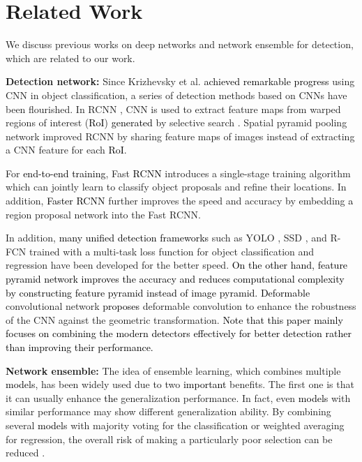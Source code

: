\documentclass[10pt,twocolumn,letterpaper]{article}
\newcommand{\RE}{\textcolor{black}}
\newcommand{\RV}{\textcolor{black}}
\begin{document}
\section{Related Work}
We discuss previous works on deep networks and network ensemble for  detection, which are  related to our work.

\textbf{Detection network:}
Since Krizhevsky et al. \cite{KrizhevskySH_NIPS12} \RE{achieved remarkable} \RV{progress} using CNN in object classification, a series of detection methods based on CNNs have been flourished. In RCNN \cite{GirshickDDM_CVPR14}, CNN is used to extract feature maps from warped regions of interest (\RV{RoI}) \RV{generated} by selective search \cite{UijlingsSGS_IJCV13}. Spatial pyramid pooling network \cite{kaiming14ECCV} improved RCNN by sharing feature maps of images instead of extracting a CNN feature for each \RV{RoI}.  




For \RV{end-to-end training}, Fast \RE{RCNN} \cite{Girshick15_ICCV15} introduces a single-stage training algorithm which can jointly learn to classify object proposals and refine their locations. In addition, \RE{Faster RCNN} \cite{RenHGS15_NIPS15} further improves the speed and accuracy by embedding \RV{a} region proposal network  into the Fast RCNN. 



In addition, \RE{many unified detection frameworks} such as YOLO \cite{RedmonDGF_CVPR16}, SSD \cite{LiuAESRFB_ECCV16}, and R-FCN \cite{DaiLHS_CORR16} trained with \RV{a} multi-task loss function for object classification and regression have been developed for the better speed. \RE{On the other hand, feature pyramid network \cite{LinDGHHB_Corr16} improves the accuracy and reduces computational complexity by constructing feature pyramid  instead of image pyramid.} \RE{Deformable} convolutional network \cite{jifeng_iccv17} \RE{proposes} deformable convolution to enhance the robustness of the CNN against the geometric transformation. 
\RE{Note that this paper mainly focuses on combining the modern detectors effectively for better detection rather than improving their performance.}




\textbf{Network ensemble:} 
The idea of ensemble learning, which combines multiple \RV{models}, has been widely used due to  two \RV{important} benefits. The first one is that it can usually enhance \RE{the} generalization performance. In fact, even \RV{models} with similar performance may show different generalization ability. By combining several \RV{models} with majority voting \cite{HansenS_PAMI90} for the classification or weighted averaging  \cite{FREUND1995256, Opitz99popularensemble, Perrone93whennetworks} for regression, the overall risk of making a particularly poor selection can be reduced  \cite{Polikar_CSM06}.
\end{document}
